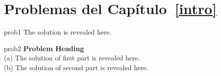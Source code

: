 
\section*{Problemas del Capítulo~\ref{intro}}

\begin{sol}{prob1}
The solution is revealed here.
\end{sol}


\begin{sol}{prob2}
\textbf{Problem Heading}\\
(a) The solution of first part is revealed here.\\
(b) The solution of second part is revealed here.
\end{sol}